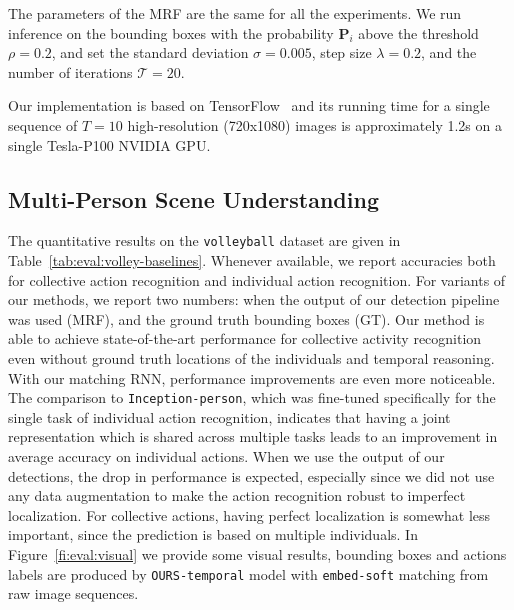 \documentclass[10pt,twocolumn,letterpaper]{article}
\newcommand{\bP}[0]{\mathbf{P}}
\newcommand{\mT}[0]{\mathcal{T}}
\begin{document}
The parameters of the MRF are the same for all the experiments. We run inference 
on the bounding boxes with the probability $\bP_i$ above the threshold $\rho=0.2$, 
and set the standard deviation
$\sigma = 0.005$, step size $\lambda = 0.2$, and the number of iterations $\mT = 20$. 

Our implementation is based on TensorFlow~\cite{Abadi2015} and its running
time for a single sequence of $T = 10$ high-resolution (720x1080) images is
approximately 1.2s on a single Tesla-P100 NVIDIA GPU. 



\subsection{Multi-Person Scene Understanding}

The quantitative results on the \texttt{volleyball} dataset are given in Table~\ref{tab:eval:volley-baselines}. Whenever available,
we report accuracies both for collective action recognition and individual
action recognition. For variants of our methods, we report two numbers: when the
output of our detection pipeline was used (MRF), and the ground truth bounding
boxes (GT). Our method is able to achieve state-of-the-art
performance for collective activity recognition even without ground truth
locations of the individuals and temporal reasoning. With our matching RNN,
performance improvements are even more noticeable. 
The comparison to \texttt{Inception-person}, which
was fine-tuned specifically for the single task of individual action recognition,
indicates that having a joint representation which is shared across multiple
tasks leads to an improvement in average accuracy on individual actions. When we use the
output of our detections, the drop in performance is expected, especially 
since we did not use any data augmentation to make the action recognition robust to
imperfect localization. For collective actions, having perfect localization is somewhat
less important, since the prediction is based on multiple individuals.
In Figure~\ref{fi:eval:visual} we provide some visual results, bounding boxes and 
actions labels are produced by \texttt{OURS-temporal} model with \texttt{embed-soft}
matching from raw image sequences.
\end{document}
